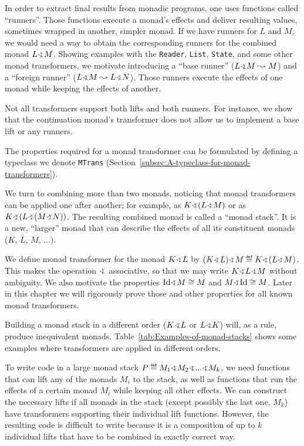 In order to extract final results from monadic programs, one uses
functions called \textsf{``}runners\textsf{''}. Those functions execute a monad\textsf{'}s
effects and deliver resulting values, sometimes wrapped in another,
simpler monad. If we have runners for $L$ and $M$, we would need
a way to obtain the corresponding runners for the combined monad $L\varangle M$.
Showing examples with the \lstinline!Reader!, \lstinline!List!,
\lstinline!State!, and some other monad transformers, we motivate
introducing a \textsf{``}base runner\textsf{''} ($L\varangle M\leadsto M$) and a
\textsf{``}foreign runner\textsf{''} ($L\varangle M\leadsto L\varangle N$). Those
runners execute the effects of one monad while keeping the effects
of another. 

Not all transformers support both lifts and both runners. For instance,
we show that the continuation monad\textsf{'}s transformer does not allow us
to implement a base lift or any runners.

The properties required for a monad transformer can be formulated
by defining a typeclass we denote \lstinline!MTrans! (Section~\ref{subsec:A-typeclass-for-monad-transformers}).

We turn to combining more than two monads, noticing that monad transformers
can be applied one after another; for example, as $K\varangle(L\varangle M)$
or as $K\varangle(L\varangle(M\varangle N))$. The resulting combined
monad is called a \textsf{``}monad stack\textsf{''}. It is a new, \textsf{``}larger\textsf{''} monad
that can describe the effects of all its constituent monads ($K$,
$L$, $M$, ...).

We define monad transformer for the monad $K\varangle L$ by $(K\varangle L)\varangle M\triangleq K\varangle(L\varangle M)$.
This makes the operation $\varangle$ associative, so that we may
write $K\varangle L\varangle M$ without ambiguity. We also motivate
the properties $\text{Id}\varangle M\cong M$ and $M\varangle\text{Id}\cong M$.
Later in this chapter we will rigorously prove those and other properties
for all known monad transformers.

Building a monad stack in a different order ($K\varangle L$ or $L\varangle K$)
will, as a rule, produce inequivalent monads. Table~\ref{tab:Examples-of-monad-stacks}
shows some examples where transformers are applied in different orders.

To write code in a large monad stack $P\triangleq M_{1}\varangle M_{2}\varangle...\varangle M_{k}$,
we need functions that can lift any of the monads $M_{i}$ to the
stack, as well as functions that run the effects of a certain monad
$M_{i}$ while keeping all other effects. We can construct the necessary
lifts if all monads in the stack (except possibly the last one, $M_{k}$)
have transformers supporting their individual lift functions. However,
the resulting code is difficult to write because it is a composition
of up to $k$ individual lifts that have to be combined in exactly
correct way. 

